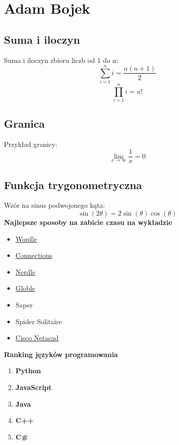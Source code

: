 \section{Adam Bojek}
\label{sec:adambojek}

\subsection*{Suma i iloczyn}
Suma i iloczyn zbioru liczb od 1 do n:
\[
\sum_{i=1}^{n} i = \frac{n(n+1)}{2}
\]
\[
\prod_{i=1}^{n} i = n!
\]

\subsection*{Granica}
Przykład granicy:
\begin{equation}
\lim_{x \to \infty} \frac{1}{x} = 0
\end{equation}

\subsection*{Funkcja trygonometryczna}
Wzór na sinus podwojonego kąta:
\begin{equation}
\sin(2\theta) = 2 \sin(\theta) \cos(\theta)
\end{equation}
\textbf{Najlepsze sposoby na zabicie czasu na wykładzie}
\begin{itemize}
    \item \href{https://www.nytimes.com/games/wordle/index.html}{Wordle}
    \item \href{https://www.nytimes.com/games/connections}{Connections}
    \item \href{https://nerdlegame.com/}{Nerdle}
    \item \href{https://globle-game.com/}{Globle}
    \item Saper
    \item Spider Solitaire
    \item \href{https://www.netacad.com/}{Cisco Netacad}
\end{itemize}

\noindent \textbf{Ranking języków programowania}
\begin{enumerate}
    \item \textbf{Python}
    \item \textbf{JavaScript}
    \item \textbf{Java}
    \item \textbf{C++}
    \item \textbf{C\#}
\end{enumerate}

